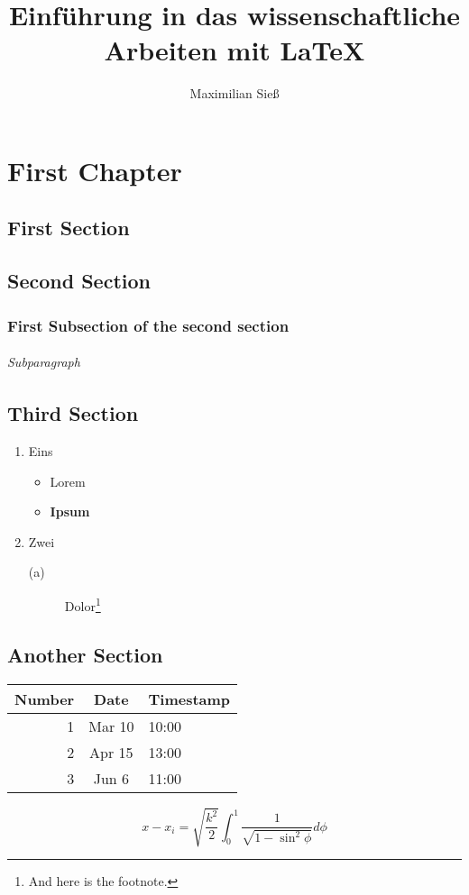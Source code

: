 \documentclass[10pt]{report}
\begin{document}
\title{Einführung in das wissenschaftliche Arbeiten mit \LaTeX}
\author{Maximilian Sieß}
\maketitle

\tableofcontents

\chapter{First Chapter}

	\section{First Section}

	\section{Second Section}
	
		\subsection{First Subsection of the second section}

			\subparagraph{Subparagraph}

	\section{Third Section}
	
	\begin{enumerate}
		\item Eins
		\begin{itemize}
			\item Lorem
			\item \textbf{Ipsum}
		\end{itemize}
		\item Zwei
		\begin{description}
			\item[(a)] Dolor\footnote{And here is the footnote.}
		\end{description}
	\end{enumerate}
	
	\section{Another Section}
	
	\begin{center}
  		\begin{tabular}{ || r  c  l  || }
 		   \hline
    		\textbf{Number} & \textbf{Date} & \textbf{Timestamp} \\ \hline
    		1 & Mar 10 & 10:00 \\ \hline
    		2 & Apr 15 & 13:00 \\ \hline
    		3 & Jun 6 & 11:00 \\
    		\hline
  		\end{tabular}
  		
	\end{center}

	\begin{equation}
		x - x_i = \sqrt{\frac{k^2}{2}} \int_0^1 \frac{1}{\sqrt{1-\sin^2 \phi}} d\phi
	\end{equation}
	
\end{document}
